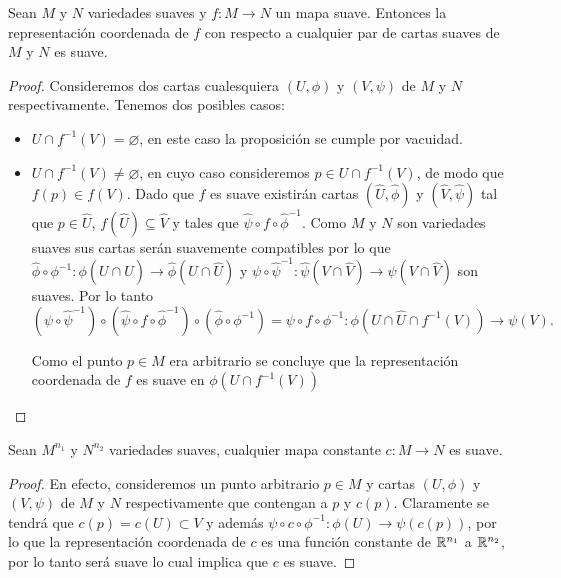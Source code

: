 \begin{theorem}\label{Teorema: Representación Suave}
	Sean $M$ y $N$ variedades suaves y $f: M \to N$ un mapa suave. Entonces la representación coordenada de $f$ con respecto a cualquier par de cartas suaves de $M$ y $N$ es suave.
\end{theorem}

\begin{proof}
	Consideremos dos cartas cualesquiera $(U,\phi)$ y $(V,\psi)$ de $M$ y $N$ respectivamente. Tenemos dos posibles casos:
	\begin{itemize}
		\item $U \cap f^{-1}(V) = \varnothing$, en este caso la proposición se cumple por vacuidad.
		\item $U \cap f^{-1}(V) \neq \varnothing$, en cuyo caso consideremos $p \in U \cap f^{-1}(V)$, de modo que $f(p) \in f(V)$. Dado que $f$ es suave existirán cartas $(\hat{U},\hat{\phi})$ y $(\hat{V},\hat{\psi})$ tal que $p \in \hat{U}$, $f(\hat{U})\subseteq \hat{V}$ y tales que $\hat{\psi} \circ f \circ \hat{\phi}^{-1}$. Como $M$ y $N$ son variedades suaves sus cartas serán suavemente compatibles por lo que $\hat{\phi} \circ \phi^{-1}: \phi(U \cap \hat{U}) \to \hat{\phi}(U \cap \hat{U})$ y $\psi \circ \hat{\psi}^{-1}: \hat{\psi}(V \cap \hat{V}) \to \psi(V \cap \hat{V})$ son suaves. Por lo tanto
		      \[
			      (\psi \circ \hat{\psi}^{-1}) \circ (\hat{\psi} \circ f \circ \hat{\phi}^{-1}) \circ (\hat{\phi} \circ \phi^{-1}) = \psi \circ f \circ \phi^{-1}: \phi(U \cap \hat{U} \cap f^{-1}(V)) \to \psi(V).
		      \]

		      Como el punto $p \in M$ era arbitrario se concluye que la representación coordenada de $f$ es suave en $\phi(U \cap f^{-1}(V))$
	\end{itemize}
\end{proof}


\begin{theorem}
	Sean $M^{n_1}$ y $N^{n_2}$ variedades suaves, cualquier mapa constante $c: M \to N$ es suave.
\end{theorem}

\begin{proof}
	En efecto, consideremos un punto arbitrario $p \in M$ y cartas $(U,\phi)$ y $(V,\psi)$ de $M$ y $N$ respectivamente que contengan a $p$ y $c(p)$. Claramente se tendrá que $c(p) = c(U) \subset V$ y además $\psi \circ c \circ \phi^{-1}: \phi(U) \to \psi(c(p))$, por lo que la representación coordenada de $c$ es una función constante de $\mathbb{R}^{n_1}$ a $\mathbb{R}^{n_2}$, por lo tanto será suave lo cual implica que $c$ es suave.
\end{proof}

